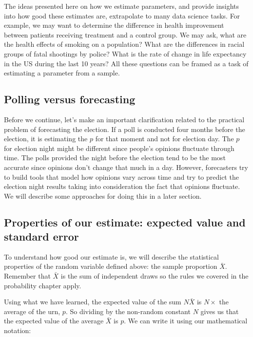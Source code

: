 \documentclass[openany]{book}
\begin{document}
The ideas presented here on how we estimate parameters, and provide insights into how good these estimates are, extrapolate to many data science tasks. For example, we may want to determine the difference in health improvement between patients receiving treatment and a control group. We may ask, what are the health effects of smoking on a population? What are the differences in racial groups of fatal shootings by police? What is the rate of change in life expectancy in the US during the last 10 years? All these questions can be framed as a task of estimating a parameter from a sample.

\hypertarget{polling-versus-forecasting}{%
\subsection{Polling versus forecasting}\label{polling-versus-forecasting}}

Before we continue, let's make an important clarification related to the practical problem of forecasting the election. If a poll is conducted four months before the election, it is estimating the \(p\) for that moment and not for election day. The \(p\) for election night might be different since people's opinions fluctuate through time. The polls provided the night before the election tend to be the most accurate since opinions don't change that much in a day. However, forecasters try to build tools that model how opinions vary across time and try to predict the election night results taking into consideration the fact that opinions fluctuate. We will describe some approaches for doing this in a later section.

\hypertarget{properties-of-our-estimate-expected-value-and-standard-error}{%
\subsection{Properties of our estimate: expected value and standard error}\label{properties-of-our-estimate-expected-value-and-standard-error}}

To understand how good our estimate is, we will describe the statistical properties of the random variable defined above: the sample proportion \(\bar{X}\). Remember that \(\bar{X}\) is the sum of independent draws so the rules we covered in the probability chapter apply.

Using what we have learned, the expected value of the sum \(N\bar{X}\) is \(N \times\) the average of the urn, \(p\). So dividing by the non-random constant \(N\) gives us that the expected value of the average \(\bar{X}\) is \(p\). We can write it using our mathematical notation:
\end{document}
